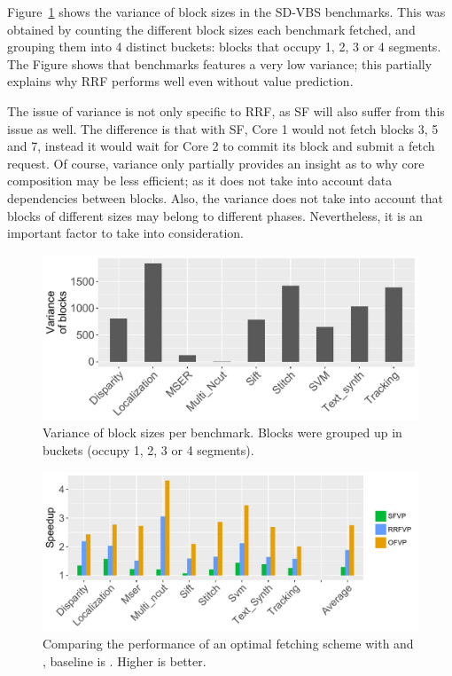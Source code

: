 Figure~\ref{fig:variance} shows the variance of block sizes in the SD-VBS benchmarks.
This was obtained by counting the different block sizes each benchmark fetched, and grouping them into 4 distinct buckets: blocks that occupy 1, 2, 3 or 4 segments.
The Figure shows that benchmarks  features a very low variance; this partially explains why RRF performs well even without value prediction.

The issue of variance is not only specific to RRF, as SF will also suffer from this issue as well.
The difference is that with SF, Core 1 would not fetch blocks 3, 5 and 7, instead it would wait for Core 2 to commit its block and submit a fetch request.
Of course, variance only partially provides an insight as to why core composition may be less efficient; as it does not take into account data dependencies between blocks.
Also, the variance does not take into account that blocks of different sizes may belong to different phases.
Nevertheless, it is an important factor to take into consideration.

\begin{figure}[t]
    \centering
    \includegraphics[width=1\textwidth]{chapter3/graphics/variance.pdf}
    \caption{Variance of block sizes per benchmark. Blocks were grouped up in buckets (occupy 1, 2, 3 or 4 segments).}
    \label{fig:variance}
	\vspace{1em}
\end{figure}


\begin{figure}[t]
    \centering
    \includegraphics[width=1\textwidth]{chapter3/graphics/optres4.pdf}
    \caption{Comparing the performance of an optimal fetching scheme with \vp{} and \nfvp{}, baseline is \novp. Higher is better.}
    \label{fig:opt_scheme}
	\vspace{1em}
\end{figure}

